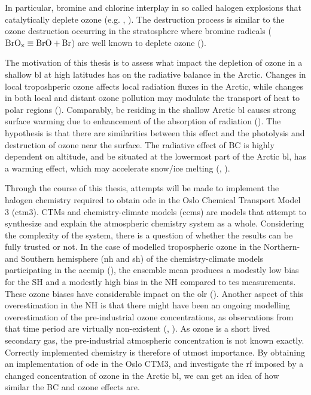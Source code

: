 \medskip

In particular, bromine and chlorine interplay in so called halogen explosions that catalytically deplete ozone (e.g. \cite{CAO}, \cite{Simpson2015}). The destruction process is similar to the ozone destruction occurring in the stratosphere where bromine radicals ($\mathrm{BrO_x} \equiv \mathrm{BrO} + \mathrm{Br}$) are well known to deplete ozone (\cite{Parella}).   

\medskip

The motivation of this thesis is to assess what impact the depletion of ozone in a shallow \acrshort{bl} at high latitudes has on the radiative balance in the Arctic. Changes in local troposhperic ozone affects local radiation fluxes in the Arctic, while changes in both local and distant ozone pollution may modulate the transport of heat to polar regions (\cite{Shindell2007}). Comparably, \acrfull{bc} residing in the shallow Arctic \acrshort{bl} causes strong surface warming due to enhancement of the absorption of radiation (\cite{Flanner2013}). The hypothesis is that there are similarities between this effect and the photolysis and destruction of ozone near the surface. The radiative effect of BC is highly dependent on altitude, and \acrfull{be} situated at the lowermost part of the Arctic \acrshort{bl}, has a warming effect, which may accelerate snow/ice melting (\cite{Flanner2013}, \cite{AMAP2015}). 

\medskip

Through the course of this thesis, attempts will be made to implement the halogen chemistry required to obtain \acrshort{ode} in the Oslo Chemical Transport Model 3 (\acrshort{ctm}3). CTMs and chemistry-climate models (\acrshort{ccm}s) are models that attempt to synthesize and explain the atmospheric chemistry system as a whole. Considering the complexity of the system, there is a question of whether the results can be fully trusted or not. In the case of modelled tropospheric ozone in the Northern- and Southern hemisphere (\acrshort{nh} and \acrshort{sh}) of the chemistry-climate models participating in the \acrfull{accmip} (\cite{Bowman2013}), the ensemble mean produces a modestly low bias for the SH and a modestly high bias in the NH compared to \acrfull{tes} measurements. These ozone biases have considerable impact on the \acrfull{olr} (\cite{Bowman2013}). Another aspect of this overestimation in the NH is that there might have been an ongoing modelling overestimation of the pre-industrial ozone concentrations, as observations from that time period are virtually non-existent (\cite{shindell2003}, \cite{Parrish2014}). As ozone is a short lived secondary gas, the pre-industrial atmospheric concentration is not known exactly. Correctly implemented chemistry is therefore of utmost importance. By obtaining an implementation of \acrshort{ode} in the Oslo CTM3, and investigate the \acrshort{rf} imposed by a changed concentration of ozone in the Arctic \acrshort{bl}, we can get an idea of how similar the BC and ozone effects are. 


